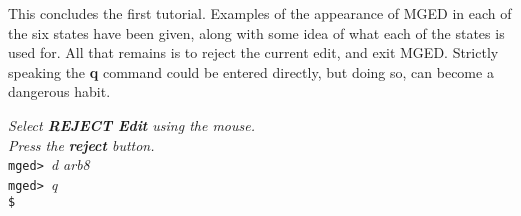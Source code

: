This concludes the first tutorial.  Examples of the appearance of MGED
in each of the six states have been given, along with some idea of what
each of the states is used for.  All that remains is to reject the current
edit, and exit MGED.  Strictly speaking the {\bf q} command could be entered
directly, but doing so, can become a dangerous habit.

\noindent
{\em Select {\bf REJECT Edit} using the mouse.}\\
{\em Press the {\bf reject} button.}\\
{\tt mged> }{\em d arb8}\\
{\tt mged> }{\em q}\\
{\tt \$ }\\
